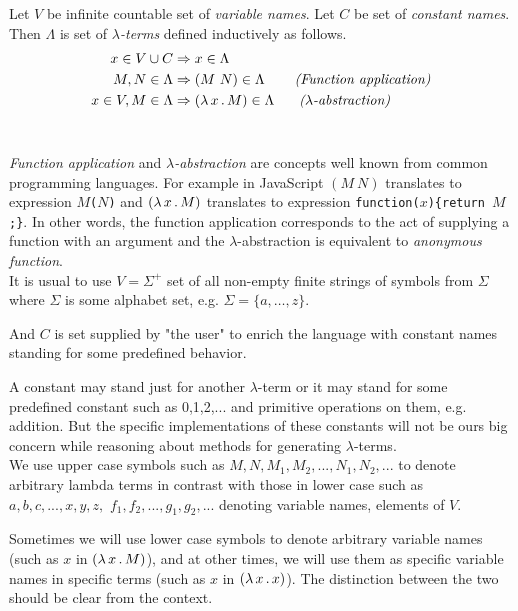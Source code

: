 \documentclass[12pt,a4paper]{report}
\newcommand{\lterm}{$\lambda$-term\xspace}
\newcommand{\lterms}{$\lambda$-terms\xspace}
\newcommand{\setDots}[2]{ 
	\lbrace #1 , \dots , #2 \rbrace
}
\begin{document}
\newcommand{\Scomb }{\mathbf{S}}
\newcommand{\Kcomb }{\mathbf{K}}
\newcommand{\Icomb }{\mathbf{I}}




\begin{definition}

Let $V$ be infinite countable set of {\it 
variable names}. Let $C$ be set of {\it constant names}.	 	
Then $\Lambda$ is set of {\it \lterms} defined inductively as follows.	
\begin{align*}
x   \in V \cup C  &\Rightarrow x     \in \Lambda \\
M,N \in \Lambda   &\Rightarrow (M~N) \in \Lambda 
\textit{~~~~~~(Function application)} \\
x   \in V , M \in \Lambda &\Rightarrow ( \lambda \, x \, . \, M ) \in \Lambda
\textit{~~~~~($\lambda$-abstraction)} 
\end{align*}~
\end{definition}



\textit{Function application} and 
\textit{$\lambda$-abstraction} are concepts
well known from common programming languages. 
For example in JavaScript 
$(M~N)$ translates to expression \texttt{$M$($N$)} and
$( \lambda \, x \, . \, M )$ translates to expression \texttt{function($x$)\{return $M$;\}}.
In other words, the function application 
corresponds to the act of supplying a function 
with an argument and
the $\lambda$-abstraction is equivalent to 
\textit{anonymous function}. \\


It is usual to use $V = \Sigma^+$ set of all non-empty finite strings of symbols 
from $\Sigma$ where $\Sigma$ is some alphabet set, e.g.  
$
\Sigma =
\setDots{a}{z}$.

And $C$ is set supplied by "the user" to enrich 
the language with constant names standing
for some predefined behavior.

A constant may stand just for another \lterm
or it may stand for some predefined constant 
such as 0,1,2,... and primitive operations on
them, e.g. addition. 
But the specific implementations 
of these constants will not be ours big concern 
while reasoning about methods for generating 
\lterms .\\

We use upper case symbols such as 
$M,N,M_1,M_2,...,N_1,N_2,...$
to denote arbitrary lambda terms in contrast with
those in lower case such as
$a,b,c,...,x,y,z,$
$f_1,f_2,...,g_1,g_2,...$
denoting variable names, elements of $V$.

Sometimes we will use lower case symbols
to denote arbitrary variable names (such as
$x$ in $( \lambda \, x \, . \, M )$),
and at other times, we will use them
as specific variable names in specific terms 
(such as $x$ in $( \lambda \, x \, . \, x )$).
The distinction between the two should be
clear from the context.
\end{document}
